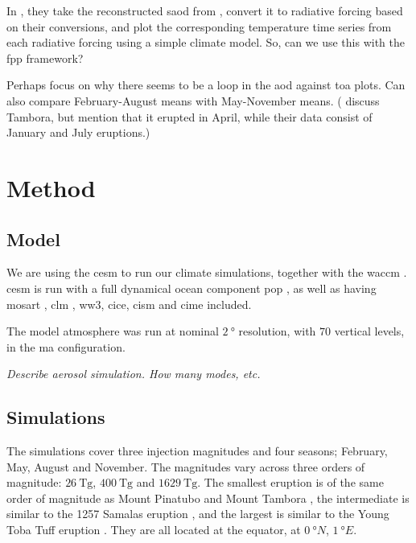 \documentclass{ametsocV5}
\begin{document}
In \citet{marshall2020}, they take the reconstructed \acrshort{saod} from
\citet{toohey2017}, convert it to radiative forcing based on their conversions, and plot
the corresponding temperature time series from each radiative forcing using a simple
climate model. So, can we use this with the \acrfull{fpp} framework?

Perhaps focus on why there seems to be a loop in the \acrshort{aod} against
\acrshort{toa} plots. Can also compare February-August means with May-November means.
(\citet{marshall2021} discuss Tambora, but mention that it erupted in April, while their
data consist of January and July eruptions.)


\section{Method}

\subsection{Model}

We are using the \acrfull{cesm} \citep{danabasoglu2020} to run our climate simulations,
together with the \acrfull{waccm} \citep{gettleman2019}. \acrshort{cesm} is run with a
full dynamical ocean component \acrfull{pop} \citep{smith2010, danabasoglu2020}, as well
as having \acrfull{mosart} \citep{li2013, danabasoglu2020}, \acrfull{clm}
\citep{lawrence2019, danabasoglu2020}, \acrfull{ww3}, \acrfull{cice}, \acrfull{cism} and
\acrfull{cime} included.

The model atmosphere was run at nominal \(\SI{2}{\degree}\) resolution, with \(70\)
vertical levels, in the \acrfull{ma} configuration.

\emph{Describe aerosol simulation. How many modes, etc.}

\subsection{Simulations}

The simulations cover three  injection magnitudes and four seasons; February,
May, August and November. The magnitudes vary across three orders of magnitude:
\(\SI{26}{\tera\gram}\), \(\SI{400}{\tera\gram}\) and \(\SI{1629}{\tera\gram}\). The
smallest eruption is of the same order of magnitude as Mount Pinatubo
\citep[\(\sim10\)--\(\SI{20}{\tera\gram}\);~e.g.,][]{timmreck2018} and Mount Tambora
\citep[\(\sim\SI{56.2}{\tera\gram}\);~e.g.,][]{zanchettin2016}, the intermediate is
similar to the 1257 Samalas eruption
\citep[\(\sim\SI{119}{\tera\gram}\);][]{toohey2017}, and the largest is similar to the
Young Toba Tuff eruption
\citep[\(10\)--\(\SI{10000}{\tera\gram}\);][and~references~therein]{jones2005}. They are
all located at the equator, at \(\SI{0}{\degree N}\), \(\SI{1}{\degree E}\).
\end{document}
